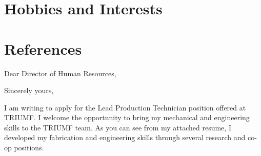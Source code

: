 \documentclass[11pt,a4paper]{moderncv} %
\begin{document}
\section{Hobbies and Interests}

\renewcommand{\listitemsymbol}{-~} %

\section{References}













\clearpage








\date{\today} %
\opening{Dear 
Director of Human Resources,} %
\closing{Sincerely yours,} %

\makelettertitle %
I am writing to apply for the Lead Production Technician position offered at TRIUMF. I welcome the opportunity to bring my mechanical and engineering skills to the TRIUMF team. As you can see from my attached resume, I developed my fabrication and engineering skills through several research and co-op positions. 
\end{document}
